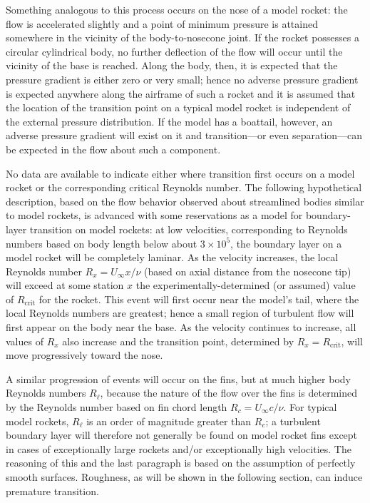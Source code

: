 Something analogous to this process occurs on the nose of
a model rocket: the flow is accelerated slightly and a point
of minimum pressure is attained somewhere in the vicinity of the
body-to-nosecone joint. If the rocket possesses a circular
cylindrical body, no further deflection of the flow will occur
until the vicinity of the base is reached. Along the body,
then, it is expected that the pressure gradient is either
zero or very small; hence no adverse pressure gradient is
expected anywhere along the airframe of such a rocket and it
is assumed that the location of the transition point on a typical
model rocket is independent of the external pressure distribution.
If the model has a boattail, however, an adverse pressure gradient
will exist on it and transition---or even separation---can be
expected in the flow about such a component.

No data are available to indicate either where transition
first occurs on a model rocket or the corresponding critical
Reynolds number. The following hypothetical description, based
on the flow behavior observed about streamlined bodies similar
to model rockets, is advanced with some reservations as a
model for boundary-layer transition on model rockets: at
low velocities, corresponding to Reynolds numbers based on
body length below about $3 \times 10^{5}$, the boundary layer on a model
rocket will be completely laminar. As the velocity increases,
the local Reynolds number $R_x = U_\infty x/\nu$ (based on axial distance
from the nosecone tip) will exceed at some station $x$ the
experimentally-determined (or assumed) value of $R_{\mathrm{crit}}$ for the rocket.
This event will first occur near the model's tail, where the
local Reynolds numbers are greatest; hence a small region
of turbulent flow will first appear on the body near the base.
As the velocity continues to increase, all values of $R_x$ also
increase and the transition point, determined by $R_x = R_{\mathrm{crit}}$,
will move progressively toward the nose.

A similar progression of events will occur on the fins,
but at much higher body Reynolds numbers $R_\ell$, because the nature
of the flow over the fins is determined by the Reynolds number
based on fin chord length $R_c = U_\infty c/\nu$. For typical model rockets,
$R_\ell$ is an order of magnitude greater than $R_c$; a turbulent boundary
layer will therefore not generally be found on model rocket fins
except in cases of exceptionally large rockets and/or exceptionally
high velocities. The reasoning of this and the last paragraph
is based on the assumption of perfectly smooth surfaces. Roughness,
as will be shown in the following section, can induce premature
transition.


